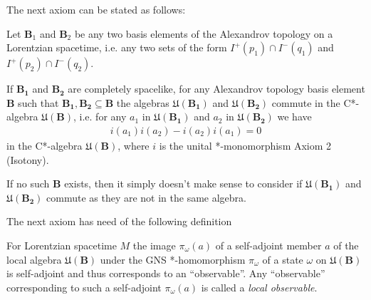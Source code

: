 The next axiom can be stated as follows:

\begin{definition}
    \label{def:local-commutativity-in-curved-spacetime}
    \leanok
    Let $\mathbf{B}_1$ and $\mathbf{B}_2$ be any two basis elements of the Alexandrov topology on a Lorentzian spacetime, i.e. any two sets of the form $I^+(p_1) \cap I^-(q_1)$ and $I^+(p_2) \cap I^-(q_2)$.
    
    If $\mathbf{B_1}$ and $\mathbf{B_2}$ are completely spacelike, for any Alexandrov topology basis element $\mathbf{B}$ such that $\mathbf{B_1}, \mathbf{B_2} \subseteq \mathbf{B}$ the algebras $\mathfrak{U}(\mathbf{B_1})$ and $\mathfrak{U}(\mathbf{B_2})$ commute in the C*-algebra $\mathfrak{U}(\mathbf{B})$, i.e. for any $a_1$ in $\mathfrak{U}(\mathbf{B_1})$ and $a_2$ in $\mathfrak{U}(\mathbf{B_2})$ we have
    \begin{align}
        i(a_1) i(a_2) - i(a_2) i(a_1) = 0
    \end{align}
    in the C*-algebra $\mathfrak{U}(\mathbf{B})$, where $i$ is the unital *-monomorphism Axiom 2 (Isotony).
    
    If no such $\mathbf{B}$ exists, then it simply doesn't make sense to consider if $\mathfrak{U}(\mathbf{B_1})$ and $\mathfrak{U}(\mathbf{B_2})$ commute as they are not in the same algebra.
\end{definition}

The next axiom has need of the following definition

\begin{definition}
    \label{def:local-observable}
    \leanok
    For Lorentzian spacetime $M$ the image $\pi_\omega(a)$ of a self-adjoint member $a$ of the local algebra $\mathfrak{U}(\mathbf{B})$ under the GNS *-homomorphism $\pi_\omega$ of a state $\omega$ on $\mathfrak{U}(\mathbf{B})$ is self-adjoint and thus corresponds to an ``observable''. Any ``observable'' corresponding to such a self-adjoint $\pi_\omega(a)$ is called a \textit{local observable}.
\end{definition}

